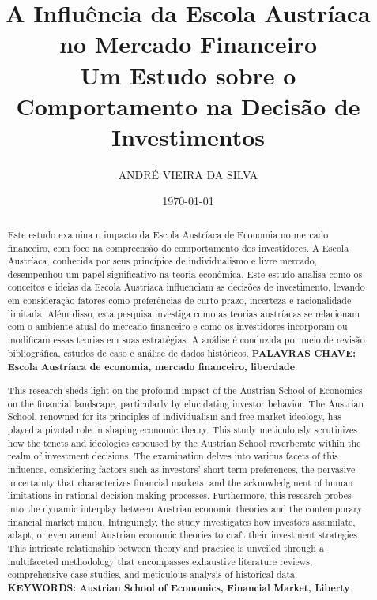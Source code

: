 \documentclass[a4paper,12pt]{article}
\title{ \textbf{\large A Influência da Escola Austríaca no Mercado Financeiro} \\
\large Um Estudo sobre o Comportamento na Decisão de Investimentos}
\author{ANDRÉ VIEIRA DA SILVA}
\date{\today}
\begin{document}
\maketitle


\begin{abstract}
Este estudo examina o impacto da Escola Austríaca de Economia no mercado financeiro,
com foco na compreensão do comportamento dos investidores. A Escola Austríaca, 
conhecida por seus princípios de individualismo e livre mercado, desempenhou um papel 
significativo na teoria econômica. Este estudo analisa como os conceitos e ideias da 
Escola Austríaca influenciam as decisões de investimento, levando em consideração 
fatores como preferências de curto prazo, incerteza e racionalidade limitada. 
Além disso, esta pesquisa investiga como as teorias austríacas se relacionam com o 
ambiente atual do mercado financeiro e como os investidores incorporam ou modificam 
essas teorias em suas estratégias. A análise é conduzida por meio de revisão bibliográfica, 
estudos de caso e análise de dados históricos. \newline
\textbf{PALAVRAS CHAVE: Escola Austr\'iaca de economia, mercado financeiro, liberdade}.
\end{abstract}

\begin{abstract}
This research sheds light on the profound impact of the Austrian School of Economics 
on the financial landscape, particularly by elucidating investor behavior. The Austrian School, 
renowned for its principles of individualism and free-market ideology, has played a pivotal 
role in shaping economic theory. This study meticulously scrutinizes how the tenets and ideologies 
espoused by the Austrian School reverberate within the realm of investment decisions.
The examination delves into various facets of this influence, considering factors such as 
investors' short-term preferences, the pervasive uncertainty that characterizes financial 
markets, and the acknowledgment of human limitations in rational decision-making processes. 
Furthermore, this research probes into the dynamic interplay between Austrian economic theories 
and the contemporary financial market milieu. Intriguingly, the study investigates how investors 
assimilate, adapt, or even amend Austrian economic theories to craft their investment strategies. 
This intricate relationship between theory and practice is unveiled through a multifaceted 
methodology that encompasses exhaustive literature reviews, comprehensive case studies, 
and meticulous analysis of historical data.\newline
\textbf{KEYWORDS: Austrian School of Economics, Financial Market, Liberty}.
\end{abstract}
\end{document}
